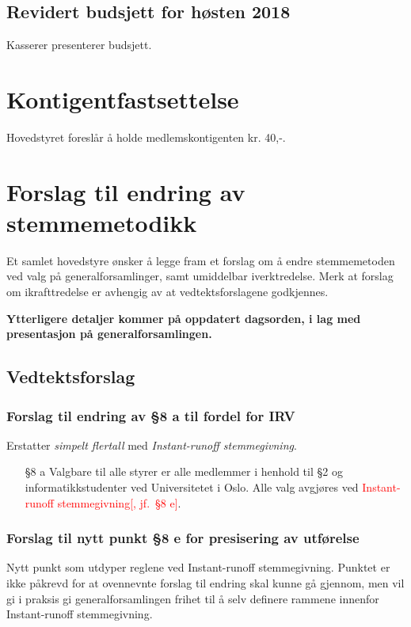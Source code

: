 \documentclass[10pt,norsk,a4paper]{article}
\begin{document}
\subsection{Revidert budsjett for høsten 2018}
Kasserer presenterer budsjett.


\section{Kontigentfastsettelse}
Hovedstyret foreslår å holde medlemskontigenten kr. 40,-.

\section{Forslag til endring av stemmemetodikk}

Et samlet hovedstyre ønsker å legge fram et forslag om å endre stemmemetoden ved valg på generalforsamlinger, samt umiddelbar iverktredelse.
Merk at forslag om ikrafttredelse er avhengig av at vedtektsforslagene godkjennes.

\textbf{Ytterligere detaljer kommer på oppdatert dagsorden, i lag med presentasjon på generalforsamlingen.}

\subsection{Vedtektsforslag}

\subsubsection{Forslag til endring av §8 a til fordel for IRV}

Erstatter \textit{simpelt flertall} med \textit{Instant-runoff stemmegivning}.

\begin{enumerate}
	\item[§8 a] Valgbare til alle styrer er alle medlemmer i henhold til §2 og informatikkstudenter ved Universitetet i Oslo. Alle valg avgjøres ved \textcolor{red}{Instant-runoff stemmegivning[, jf.~§8 e]}.
\end{enumerate}

\subsubsection{Forslag til nytt punkt §8 e for presisering av utførelse}

Nytt punkt som utdyper reglene ved Instant-runoff stemmegivning. Punktet er ikke påkrevd for at ovennevnte forslag til endring skal kunne gå gjennom, men vil gi i praksis gi generalforsamlingen frihet til å selv definere rammene innenfor Instant-runoff stemmegivning.
\end{document}
